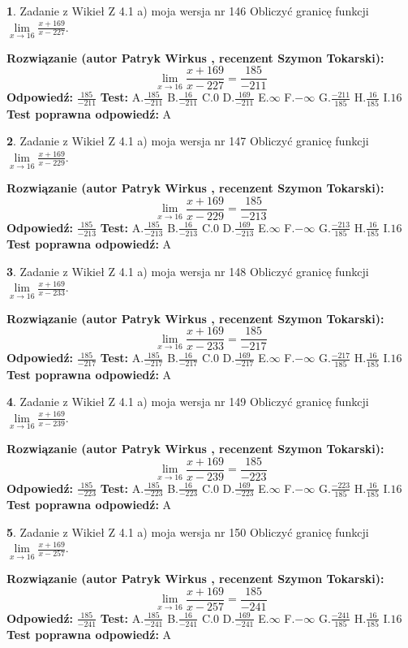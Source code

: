 \documentclass[12pt, a4paper]{article}
\theoremstyle{definition} %
\newtheorem{zad}{}
\newcommand{\zadStart}[1]{\begin{zad}#1\newline}
\newcommand{\zadStop}{\end{zad}}
\newcommand{\rozwStart}[2]{\noindent \textbf{Rozwiązanie (autor #1 , recenzent #2): }\newline}
\newcommand{\rozwStop}{\newline}
\newcommand{\odpStart}{\noindent \textbf{Odpowiedź:}\newline}
\newcommand{\odpStop}{\newline}
\newcommand{\testStart}{\noindent \textbf{Test:}\newline}
\newcommand{\testStop}{\newline}
\newcommand{\kluczStart}{\noindent \textbf{Test poprawna odpowiedź:}\newline}
\newcommand{\kluczStop}{\newline}
\begin{document}
\zadStart{Zadanie z Wikieł Z 4.1 a) moja wersja nr 146}
Obliczyć granicę funkcji $\lim\limits_{x\to16}\frac{x+169}{x-227}$.
\zadStop
\rozwStart{Patryk Wirkus}{Szymon Tokarski}
$$\lim\limits_{x\to16}\frac{x+169}{x-227} = \frac{185}{-211}$$
\rozwStop
\odpStart
$\frac{185}{-211}$
\odpStop
\testStart
A.$\frac{185}{-211}$
B.$\frac{16}{-211}$
C.$0$
D.$\frac{169}{-211}$
E.$\infty$
F.$-\infty$
G.$\frac{-211}{185}$
H.$\frac{16}{185}$
I.$16$
\testStop
\kluczStart
A
\kluczStop



\zadStart{Zadanie z Wikieł Z 4.1 a) moja wersja nr 147}
Obliczyć granicę funkcji $\lim\limits_{x\to16}\frac{x+169}{x-229}$.
\zadStop
\rozwStart{Patryk Wirkus}{Szymon Tokarski}
$$\lim\limits_{x\to16}\frac{x+169}{x-229} = \frac{185}{-213}$$
\rozwStop
\odpStart
$\frac{185}{-213}$
\odpStop
\testStart
A.$\frac{185}{-213}$
B.$\frac{16}{-213}$
C.$0$
D.$\frac{169}{-213}$
E.$\infty$
F.$-\infty$
G.$\frac{-213}{185}$
H.$\frac{16}{185}$
I.$16$
\testStop
\kluczStart
A
\kluczStop



\zadStart{Zadanie z Wikieł Z 4.1 a) moja wersja nr 148}
Obliczyć granicę funkcji $\lim\limits_{x\to16}\frac{x+169}{x-233}$.
\zadStop
\rozwStart{Patryk Wirkus}{Szymon Tokarski}
$$\lim\limits_{x\to16}\frac{x+169}{x-233} = \frac{185}{-217}$$
\rozwStop
\odpStart
$\frac{185}{-217}$
\odpStop
\testStart
A.$\frac{185}{-217}$
B.$\frac{16}{-217}$
C.$0$
D.$\frac{169}{-217}$
E.$\infty$
F.$-\infty$
G.$\frac{-217}{185}$
H.$\frac{16}{185}$
I.$16$
\testStop
\kluczStart
A
\kluczStop



\zadStart{Zadanie z Wikieł Z 4.1 a) moja wersja nr 149}
Obliczyć granicę funkcji $\lim\limits_{x\to16}\frac{x+169}{x-239}$.
\zadStop
\rozwStart{Patryk Wirkus}{Szymon Tokarski}
$$\lim\limits_{x\to16}\frac{x+169}{x-239} = \frac{185}{-223}$$
\rozwStop
\odpStart
$\frac{185}{-223}$
\odpStop
\testStart
A.$\frac{185}{-223}$
B.$\frac{16}{-223}$
C.$0$
D.$\frac{169}{-223}$
E.$\infty$
F.$-\infty$
G.$\frac{-223}{185}$
H.$\frac{16}{185}$
I.$16$
\testStop
\kluczStart
A
\kluczStop



\zadStart{Zadanie z Wikieł Z 4.1 a) moja wersja nr 150}
Obliczyć granicę funkcji $\lim\limits_{x\to16}\frac{x+169}{x-257}$.
\zadStop
\rozwStart{Patryk Wirkus}{Szymon Tokarski}
$$\lim\limits_{x\to16}\frac{x+169}{x-257} = \frac{185}{-241}$$
\rozwStop
\odpStart
$\frac{185}{-241}$
\odpStop
\testStart
A.$\frac{185}{-241}$
B.$\frac{16}{-241}$
C.$0$
D.$\frac{169}{-241}$
E.$\infty$
F.$-\infty$
G.$\frac{-241}{185}$
H.$\frac{16}{185}$
I.$16$
\testStop
\kluczStart
A
\kluczStop
\end{document}
